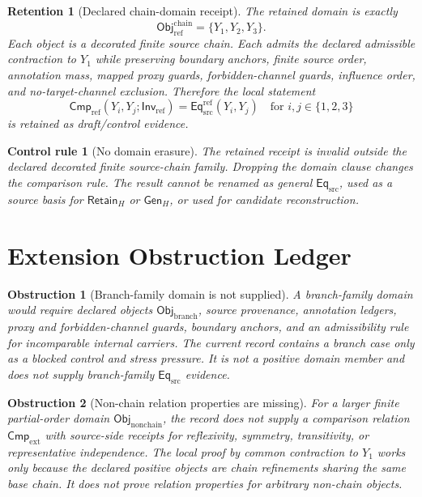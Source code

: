 \documentclass[11pt]{article}
\newcommand{\EqSrc}{\mathsf{Eq}_{\mathrm{src}}}
\newcommand{\EqRef}{\mathsf{Eq}_{\mathrm{src}}^{\mathrm{ref}}}
\newcommand{\ObjRef}{\mathsf{Obj}_{\mathrm{ref}}}
\newcommand{\ObjBranch}{\mathsf{Obj}_{\mathrm{branch}}}
\newcommand{\ObjNonChain}{\mathsf{Obj}_{\mathrm{nonchain}}}
\newcommand{\InvRef}{\mathsf{Inv}_{\mathrm{ref}}}
\newcommand{\CmpRef}{\mathsf{Cmp}_{\mathrm{ref}}}
\newcommand{\CmpExt}{\mathsf{Cmp}_{\mathrm{ext}}}
\newcommand{\RetainH}{\mathsf{Retain}_{H}}
\newcommand{\GenH}{\mathsf{Gen}_{H}}
\newtheorem{retention}{Retention}
\newtheorem{obstruction}{Obstruction}
\newtheorem{controlrule}{Control rule}
\begin{document}
\begin{retention}[Declared chain-domain receipt]
The retained domain is exactly
\[
    \ObjRef^{\mathrm{chain}}=\{Y_{1},Y_{2},Y_{3}\}.
\]
Each object is a decorated finite source chain. Each admits the declared
admissible contraction to \(Y_{1}\) while preserving boundary anchors,
finite source order, annotation mass, mapped proxy guards,
forbidden-channel guards, influence order, and no-target-channel
exclusion. Therefore the local statement
\[
    \CmpRef(Y_i,Y_j;\InvRef)=\EqRef(Y_i,Y_j)
    \quad\text{for }i,j\in\{1,2,3\}
\]
is retained as draft/control evidence.
\end{retention}

\begin{controlrule}[No domain erasure]
The retained receipt is invalid outside the declared decorated finite
source-chain family. Dropping the domain clause changes the comparison
rule. The result cannot be renamed as general \(\EqSrc\), used as a
source basis for \(\RetainH\) or \(\GenH\), or used for candidate
reconstruction.
\end{controlrule}

\section{Extension Obstruction Ledger}

\begin{obstruction}[Branch-family domain is not supplied]
A branch-family domain would require declared objects
\(\ObjBranch\), source provenance, annotation ledgers, proxy and
forbidden-channel guards, boundary anchors, and an admissibility rule for
incomparable internal carriers. The current record contains a branch case
only as a blocked control and stress pressure. It is not a positive
domain member and does not supply branch-family \(\EqSrc\) evidence.
\end{obstruction}

\begin{obstruction}[Non-chain relation properties are missing]
For a larger finite partial-order domain \(\ObjNonChain\), the record
does not supply a comparison relation \(\CmpExt\) with source-side
receipts for reflexivity, symmetry, transitivity, or representative
independence. The local proof by common contraction to \(Y_{1}\) works
only because the declared positive objects are chain refinements sharing
the same base chain. It does not prove relation properties for arbitrary
non-chain objects.
\end{obstruction}
\end{document}
